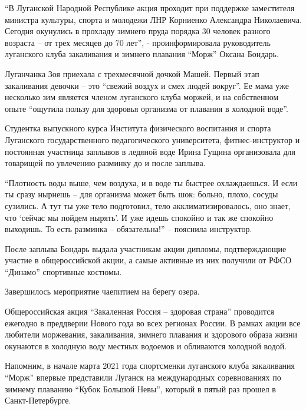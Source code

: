 
\enquote{В Луганской Народной Республике акция проходит при поддержке заместителя
министра культуры, спорта и молодежи ЛНР Корниенко Александра Николаевича.
Сегодня окунулись в прохладу зимнего пруда порядка 30 человек разного возраста
– от трех месяцев до 70 лет}, - проинформировала руководитель луганского клуба
закаливания и зимнего плавания \enquote{Морж} Оксана Бондарь.


Луганчанка Зоя приехала с трехмесячной дочкой Машей. Первый этап закаливания
девочки – это \enquote{свежий воздух и смех людей вокруг}. Ее мама уже несколько зим
является членом луганского клуба моржей, и на собственном опыте \enquote{ощутила пользу
для здоровья организма от плавания в холодной воде}.


Студентка выпускного курса Института физического воспитания и спорта Луганского
государственного педагогического университета, фитнес-инструктор и постоянная
участница заплывов в ледяной воде Ирина Гущина организовала для товарищей по
увлечению разминку до и после заплыва.


\enquote{Плотность воды выше, чем воздуха, и в воде ты быстрее охлаждаешься. И если ты
сразу нырнешь – для организма может быть шок: больно, плохо, сосуды сузились. А
тут ты уже тело подготовил, тело акклиматизировалось, оно знает, что \enquote{сейчас мы
пойдем нырять}. И уже идешь спокойно и так же спокойно выходишь. То есть
разминка – обязательна!} – пояснила инструктор.


После заплыва Бондарь выдала участникам акции дипломы, подтверждающие участие в
общероссийской акции, а самые активные из них получили от РФСО \enquote{Динамо}
спортивные костюмы.

Завершилось мероприятие чаепитием на берегу озера.

Общероссийская акция \enquote{Закаленная Россия – здоровая страна} проводится ежегодно
в преддверии Нового года во всех регионах России. В рамках акции все любители
моржевания, закаливания, зимнего плавания и здорового образа жизни окунаются в
холодную воду местных водоемов и обливаются холодной водой.

Напомним, в начале марта 2021 года спортсменки луганского клуба закаливания
\enquote{Морж} впервые представили Луганск на международных соревнованиях по зимнему
плаванию \enquote{Кубок Большой Невы}, который в пятый раз прошел в Санкт-Петербурге. 

